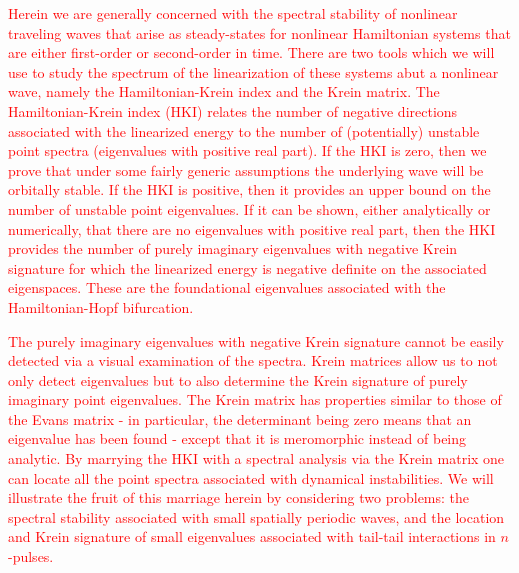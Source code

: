 \documentclass[review,onefignum,onetabnum]{siamart171218}
\newcommand{\revised}[1]{ \textcolor{red}{#1} }
\begin{document}
\revised{%
Herein we are generally concerned with the spectral stability of nonlinear traveling waves that arise as steady-states for nonlinear Hamiltonian systems that are either first-order or second-order in time.  There are two tools which we will use to study the spectrum of the linearization of these systems abut a nonlinear wave, namely the Hamiltonian-Krein index and the Krein matrix. The Hamiltonian-Krein index (HKI) relates the number of negative directions associated with the linearized energy to the number of (potentially) unstable point spectra (eigenvalues with positive real part). If the HKI is zero, then we prove that under some fairly generic assumptions the underlying wave will be orbitally stable. If the HKI is positive, then it provides an upper bound on the number of unstable point eigenvalues. If it can be shown, either analytically or numerically, that there are no eigenvalues with positive real part, then the HKI provides the number of purely imaginary eigenvalues with negative Krein signature for which the linearized energy is negative definite on the associated eigenspaces. These are the foundational eigenvalues associated with the Hamiltonian-Hopf bifurcation.
}%

\revised{%
The purely imaginary eigenvalues with negative Krein signature cannot be easily detected via a visual examination of the spectra. Krein matrices allow us to not only detect eigenvalues but to also determine the Krein signature of purely imaginary point eigenvalues. The Krein matrix has properties similar to those of the Evans matrix - in particular, the determinant being zero means that an eigenvalue has been found - except that it is meromorphic instead of being analytic.  By marrying the HKI with a spectral analysis via the Krein matrix one can locate all the point spectra associated with dynamical instabilities. We will illustrate the fruit of this marriage herein by considering two problems: the spectral stability associated with small spatially periodic waves, and the location and Krein signature of small eigenvalues associated with tail-tail interactions in $n$-pulses.
}%
\end{document}
